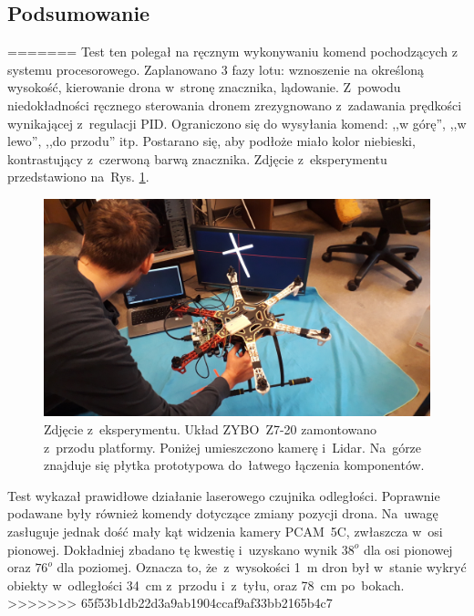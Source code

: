 \subsection{Podsumowanie}
=======
Test ten polegał na ręcznym wykonywaniu komend pochodzących z systemu procesorowego. Zaplanowano 3 fazy lotu: wznoszenie na określoną wysokość, kierowanie drona w~stronę znacznika, lądowanie. Z~powodu niedokładności ręcznego sterowania dronem zrezygnowano z~zadawania prędkości wynikającej z~regulacji PID. Ograniczono się do wysyłania komend: ,,w górę'', ,,w lewo'', ,,do przodu'' itp. Postarano się, aby podłoże miało kolor niebieski, kontrastujący z~czerwoną barwą znacznika. Zdjęcie z~eksperymentu przedstawiono na~Rys. \ref{fig:eksperyment}.\\
\begin{figure}[h]
	\centering
	\includegraphics[width=\textwidth]{eksperyment.jpg}
	\caption{Zdjęcie z~eksperymentu. Układ ZYBO~Z7-20 zamontowano z~przodu platformy. Poniżej umieszczono kamerę i~Lidar. Na~górze znajduje się płytka prototypowa do~łatwego łączenia komponentów.}
	\label{fig:eksperyment}
\end{figure}
Test wykazał prawidłowe działanie laserowego czujnika odległości. Poprawnie podawane były również komendy dotyczące zmiany pozycji drona. Na~uwagę zasługuje jednak dość mały kąt widzenia kamery PCAM~5C, zwłaszcza w~osi pionowej. Dokładniej zbadano tę kwestię i~uzyskano wynik $38^o$ dla osi pionowej oraz $76^o$ dla poziomej. Oznacza to, że~z~wysokości 1~m dron był w~stanie wykryć obiekty w~odległości 34~cm z~przodu i~z~tyłu, oraz 78~cm po~bokach.
>>>>>>> 65f53b1db22d3a9ab1904ccaf9af33bb2165b4c7


